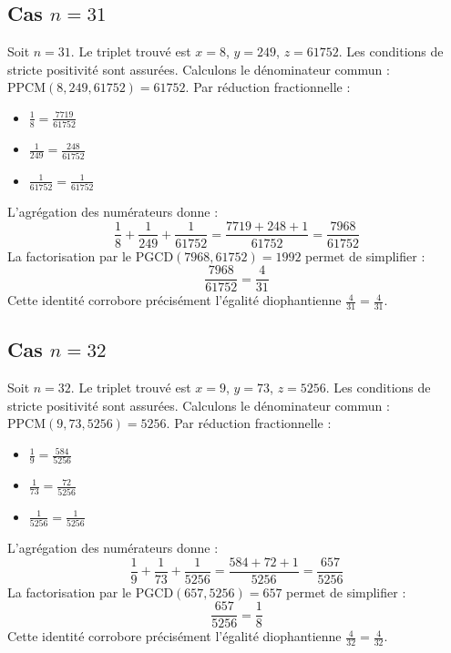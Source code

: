 \documentclass[11pt,a4paper]{article}
\begin{document}
\subsection{Cas $n = 31$}
Soit $n = 31$. Le triplet trouvé est $x = 8$, $y = 249$, $z = 61752$.
Les conditions de stricte positivité sont assurées.
Calculons le dénominateur commun : $\text{PPCM}(8, 249, 61752) = 61752$.
Par réduction fractionnelle :
\begin{itemize}
    \item $\frac{1}{8} = \frac{7719}{61752}$
    \item $\frac{1}{249} = \frac{248}{61752}$
    \item $\frac{1}{61752} = \frac{1}{61752}$
\end{itemize}
L'agrégation des numérateurs donne :
$$ \frac{1}{8} + \frac{1}{249} + \frac{1}{61752} = \frac{7719 + 248 + 1}{61752} = \frac{7968}{61752} $$
La factorisation par le $\text{PGCD}(7968, 61752) = 1992$ permet de simplifier :
$$ \frac{7968}{61752} = \frac{4}{31} $$
Cette identité corrobore précisément l'égalité diophantienne $\frac{4}{31} = \frac{4}{31}$.

\subsection{Cas $n = 32$}
Soit $n = 32$. Le triplet trouvé est $x = 9$, $y = 73$, $z = 5256$.
Les conditions de stricte positivité sont assurées.
Calculons le dénominateur commun : $\text{PPCM}(9, 73, 5256) = 5256$.
Par réduction fractionnelle :
\begin{itemize}
    \item $\frac{1}{9} = \frac{584}{5256}$
    \item $\frac{1}{73} = \frac{72}{5256}$
    \item $\frac{1}{5256} = \frac{1}{5256}$
\end{itemize}
L'agrégation des numérateurs donne :
$$ \frac{1}{9} + \frac{1}{73} + \frac{1}{5256} = \frac{584 + 72 + 1}{5256} = \frac{657}{5256} $$
La factorisation par le $\text{PGCD}(657, 5256) = 657$ permet de simplifier :
$$ \frac{657}{5256} = \frac{1}{8} $$
Cette identité corrobore précisément l'égalité diophantienne $\frac{4}{32} = \frac{4}{32}$.
\end{document}
